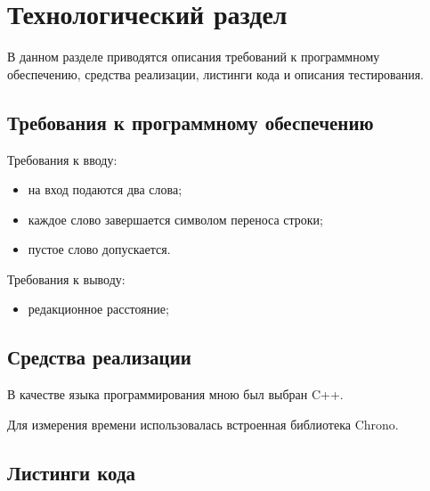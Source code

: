 \chapter{Технологический раздел}
\label{cha:impl}

В данном разделе приводятся описания требований к программному обеспечению, средства реализации, листинги кода и описания тестирования.

\section{Требования к программному обеспечению}

Требования к вводу:
\begin{itemize}
    \item на вход подаются два слова;
    \item каждое слово завершается символом переноса строки;
    \item пустое слово допускается.
\end{itemize}
Требования к выводу:
\begin{itemize}
    \item редакционное расстояние;
\end{itemize}

\section{Средства реализации}

В качестве языка программирования мною был выбран C++.

Для измерения времени использовалась встроенная библиотека Chrono.

\section{Листинги кода}

